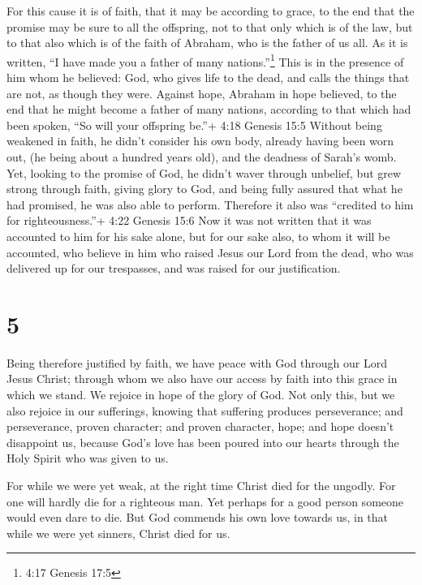 For this cause it is of faith, that it may be according to
grace, to the end that the promise may be sure to all the offspring, not
to that only which is of the law, but to that also which is of the faith
of Abraham, who is the father of us all.  As it is written,
``I have made you a father of many nations.''\footnote{4:17 Genesis 17:5}
This is in the presence of him whom he believed: God, who gives life to
the dead, and calls the things that are not, as though they were.
 Against hope, Abraham in hope believed, to the end that he
might become a father of many nations, according to that which had been
spoken, ``So will your offspring be.''+ 4:18 Genesis 15:5 
Without being weakened in faith, he didn't consider his own body,
already having been worn out, (he being about a hundred years old), and
the deadness of Sarah's womb.  Yet, looking to the promise
of God, he didn't waver through unbelief, but grew strong through faith,
giving glory to God,  and being fully assured that what he
had promised, he was also able to perform.  Therefore it
also was ``credited to him for righteousness.''+ 4:22 Genesis 15:6
 Now it was not written that it was accounted to him for
his sake alone,  but for our sake also, to whom it will be
accounted, who believe in him who raised Jesus our Lord from the dead,
 who was delivered up for our trespasses, and was raised
for our justification.

\hypertarget{section-4}{%
\section{5}\label{section-4}}

 Being therefore justified by faith, we have peace with God
through our Lord Jesus Christ;  through whom we also have
our access by faith into this grace in which we stand. We rejoice in
hope of the glory of God.  Not only this, but we also
rejoice in our sufferings, knowing that suffering produces perseverance;
 and perseverance, proven character; and proven character,
hope;  and hope doesn't disappoint us, because God's love
has been poured into our hearts through the Holy Spirit who was given to
us.

 For while we were yet weak, at the right time Christ died
for the ungodly.  For one will hardly die for a righteous
man. Yet perhaps for a good person someone would even dare to die.
 But God commends his own love towards us, in that while we
were yet sinners, Christ died for us.

